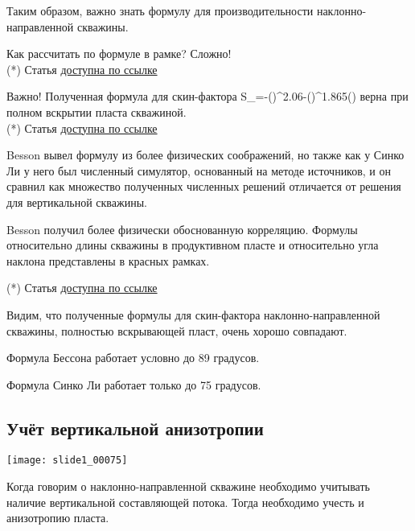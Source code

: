 \documentclass[main.tex]{subfiles}
\begin{document}
Таким образом, важно знать формулу для производительности наклонно-направленной скважины.

Как рассчитать по формуле в рамке? Сложно!\\

(*) Статья \href{https://mualal.github.io/source/tex/hydrocarbons2022/articles/cinco1975.pdf}{доступна по ссылке}


Важно! Полученная формула для скин-фактора
\beq
S_\theta=-\left(\right)^{2.06}-\left(\right)^{1.865}\cdot{}\left(\right)
\eeq
верна при полном вскрытии пласта скважиной.\\

(*) Статья \href{https://mualal.github.io/source/tex/hydrocarbons2022/articles/cinco1975.pdf}{доступна по ссылке}


Besson вывел формулу из более физических соображений, но также как у Синко Ли у него был численный симулятор, основанный на методе источников, и он сравнил как множество полученных численных решений отличается от решения для вертикальной скважины.

Besson получил более физически обоснованную корреляцию. Формулы относительно длины скважины в продуктивном пласте и относительно угла наклона представлены в красных рамках.

(*) Статья \href{https://mualal.github.io/source/tex/hydrocarbons2022/articles/besson1990.pdf}{доступна по ссылке}


Видим, что полученные формулы для скин-фактора наклонно-направленной скважины, полностью вскрывающей пласт, очень хорошо совпадают.

Формула Бессона работает условно до 89 градусов.

Формула Синко Ли работает только до 75 градусов.

\subsection{Учёт вертикальной анизотропии}

\texttt{[image: slide1\_00075]}

Когда говорим о наклонно-направленной скважине необходимо учитывать наличие вертикальной составляющей потока. Тогда необходимо учесть и анизотропию пласта.\\
\end{document}

